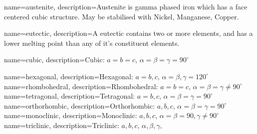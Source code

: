 
 
{
    name=austenite,
    description={Austenite is gamma phased iron which has a face centered cubic structure.  May be stabilised with Nickel, Manganese, Copper.}
}

{
    name=eutectic,
    description={A eutectic contains two or more elements, and has a lower melting point than any of it's constituent elements.}
}
 
{
    name=cubic,
    description={Cubic: $a = b = c$, $ \alpha = \beta = \gamma = 90^{\circ}$}
}

{
    name=hexagonal,
    description={Hexagonal: $a = b, c $, $ \alpha = \beta, \gamma = 120^{\circ}$}
}
{
    name=rhombohedral,
    description={Rhombohedral: $a = b = c $, $ \alpha = \beta = \gamma \neq 90^{\circ}$}
}
{
    name=tetragonal,
    description={Tetragonal: $a = b, c $, $ \alpha = \beta = \gamma = 90^{\circ}$}
}
{
    name=orthorhombic,
    description={Orthorhombic: $a, b, c $, $ \alpha = \beta = \gamma = 90^{\circ}$}
}
{
    name=monoclinic,
    description={Monoclinic: $a, b, c $, $ \alpha = \beta = 90, \gamma \neq 90^{\circ}$}
}
{
    name=triclinic,
    description={Triclinic: $a, b, c $, $ \alpha, \beta, \gamma, $}
}










